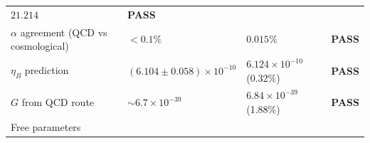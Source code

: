 \documentclass[
  11pt,
]{article}
\begin{document}
\begin{longtable}[]{@{}llll@{}}
\begin{minipage}[t]{0.22\columnwidth}
\(21.214\)\strut
\end{minipage} & \begin{minipage}[t]{0.22\columnwidth}\raggedright
\textbf{PASS}\strut
\end{minipage}\tabularnewline
\begin{minipage}[t]{0.22\columnwidth}\raggedright
\(\alpha\) agreement (QCD vs cosmological)\strut
\end{minipage} & \begin{minipage}[t]{0.22\columnwidth}\raggedright
\(< 0.1\%\)\strut
\end{minipage} & \begin{minipage}[t]{0.22\columnwidth}\raggedright
\(0.015\%\)\strut
\end{minipage} & \begin{minipage}[t]{0.22\columnwidth}\raggedright
\textbf{PASS}\strut
\end{minipage}\tabularnewline
\begin{minipage}[t]{0.22\columnwidth}\raggedright
\(\eta_B\) prediction\strut
\end{minipage} & \begin{minipage}[t]{0.22\columnwidth}\raggedright
\((6.104 \pm 0.058) \times 10^{-10}\)\strut
\end{minipage} & \begin{minipage}[t]{0.22\columnwidth}\raggedright
\(6.124 \times 10^{-10}\) (0.32\%)\strut
\end{minipage} & \begin{minipage}[t]{0.22\columnwidth}\raggedright
\textbf{PASS}\strut
\end{minipage}\tabularnewline
\begin{minipage}[t]{0.22\columnwidth}\raggedright
\(G\) from QCD route\strut
\end{minipage} & \begin{minipage}[t]{0.22\columnwidth}\raggedright
\(\sim 6.7 \times 10^{-39}\)\strut
\end{minipage} & \begin{minipage}[t]{0.22\columnwidth}\raggedright
\(6.84 \times 10^{-39}\) (1.88\%)\strut
\end{minipage} & \begin{minipage}[t]{0.22\columnwidth}\raggedright
\textbf{PASS}\strut
\end{minipage}\tabularnewline
\begin{minipage}[t]{0.22\columnwidth}\raggedright
Free parameters\strut
\end{minipage} & \begin{minipage}[t]{0.22\columnwidth}\raggedright

\end{minipage}
\end{longtable}
\end{document}
